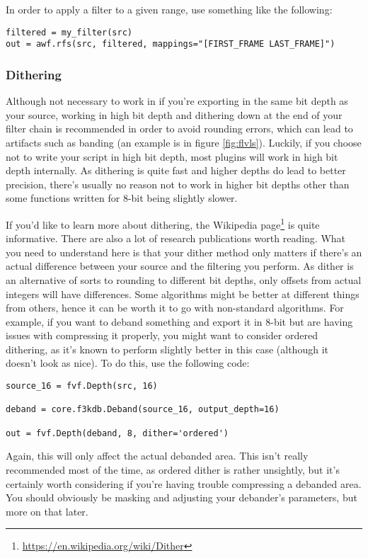 \documentclass{scrartcl}
\begin{document}
In order to apply a filter to a given range, use something like the following:
\begin{lstlisting}
filtered = my_filter(src)
out = awf.rfs(src, filtered, mappings="[FIRST_FRAME LAST_FRAME]")
\end{lstlisting}

\subsubsection{Dithering}

Although not necessary to work in if you're exporting in the same bit depth as your source, working in high bit depth and dithering down at the end of your filter chain is recommended in order to avoid rounding errors, which can lead to artifacts such as banding (an example is in figure \ref{fig:flvls}).  Luckily, if you choose not to write your script in high bit depth, most plugins will work in high bit depth internally.  As dithering is quite fast and higher depths do lead to better precision, there's usually no reason not to work in higher bit depths other than some functions written for 8-bit being slightly slower.

If you'd like to learn more about dithering, the Wikipedia page\footnote{\url{https://en.wikipedia.org/wiki/Dither}} is quite informative.  There are also a lot of research publications worth reading.  What you need to understand here is that your dither method only matters if there's an actual difference between your source and the filtering you perform.  As dither is an alternative of sorts to rounding to different bit depths, only offsets from actual integers will have differences.  Some algorithms might be better at different things from others, hence it can be worth it to go with non-standard algorithms.  For example, if you want to deband something and export it in 8-bit but are having issues with compressing it properly, you might want to consider ordered dithering, as it's known to perform slightly better in this case (although it doesn't look as nice).  To do this, use the following code:
\begin{lstlisting}
source_16 = fvf.Depth(src, 16)

deband = core.f3kdb.Deband(source_16, output_depth=16)

out = fvf.Depth(deband, 8, dither='ordered')
\end{lstlisting}
Again, this will only affect the actual debanded area.  This isn't really recommended most of the time, as ordered dither is rather unsightly, but it's certainly worth considering if you're having trouble compressing a debanded area.  You should obviously be masking and adjusting your debander's parameters, but more on that later.
\end{document}
